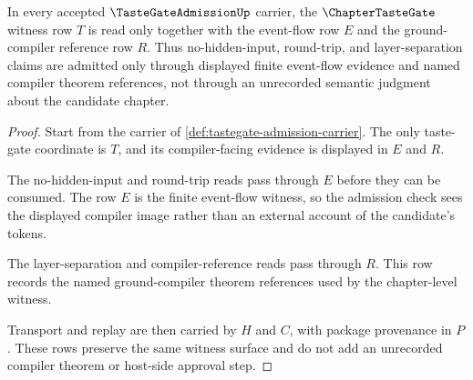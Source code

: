 \begin{theorem}
\label{thm:tastegate-admission-ground-compiler-witnesses}
In every accepted $\TasteGateAdmissionUp$ carrier, the $\ChapterTasteGate$ witness row $T$ is read only together with the event-flow row $E$ and the ground-compiler reference row $R$. Thus no-hidden-input, round-trip, and layer-separation claims are admitted only through displayed finite event-flow evidence and named compiler theorem references, not through an unrecorded semantic judgment about the candidate chapter.
\end{theorem}
\begin{proof}
Start from the carrier of \autoref{def:tastegate-admission-carrier}. The only taste-gate coordinate is $T$, and its compiler-facing evidence is displayed in $E$ and $R$.

The no-hidden-input and round-trip reads pass through $E$ before they can be consumed. The row $E$ is the finite event-flow witness, so the admission check sees the displayed compiler image rather than an external account of the candidate's tokens.

The layer-separation and compiler-reference reads pass through $R$. This row records the named ground-compiler theorem references used by the chapter-level witness.

Transport and replay are then carried by $H$ and $C$, with package provenance in $P$. These rows preserve the same witness surface and do not add an unrecorded compiler theorem or host-side approval step.
\end{proof}

